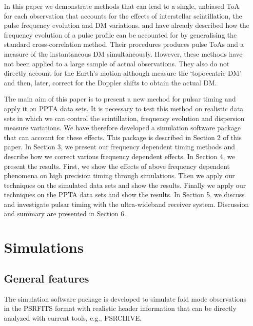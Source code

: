 \documentclass[useAMS,usenatbib]{mn2e}
\begin{document}
In this paper we demonstrate methods that can lead to a single, unbiased ToA for each 
observation that accounts for the effects of interstellar scintillation, the pulse frequency 
evolution and DM variations. \citet{Pennucci14} and \citet{Liu14} have already described how 
the frequency evolution of a pulse profile can be accounted for by generalising the standard 
cross-correlation method. Their procedures produces pulse ToAs and a measure of the instantaneous 
DM simultaneously. However, these methods have not been applied to a large sample of actual 
observations. They also do not directly account for the Earth's motion although \citet{Pennucci14} 
measure the `topocentric DM' and then, later, correct for the Doppler shifts to obtain the 
actual DM.

The main aim of this paper is to present a new mechod for pulsar timing and apply it on 
PPTA data sets. It is necessary to test this method on realistic data sets in which we can control 
the scintillation, frequency evolution and dispersion measure variations. We have therefore 
developed a simulation software package that can account for these effects. This package is 
described in Section 2 of this paper.
%
In Section 3, we present our frequency dependent timing methods and describe how we correct 
various frequency dependent effects.
%
In Section 4, we present the results. First, we show the effects of above frequency 
dependent phenomena on high precision timing through simulations. Then we apply our 
techniques on the simulated data sets and show the results. Finally we apply our 
techniques on the PPTA data sets and show the results.
%
In Section 5, we discuss and investigate pulsar timing with the ultra-wideband 
receiver system.
%
Discussion and summary are presented in Section 6.

\section{Simulations}

\subsection{General features}

The simulation software package is developed to simulate fold mode observations in the 
PSRFITS format with realistic header information that can be directly analyzed with current 
tools, e.g., PSRCHIVE. 
%
\end{document}
